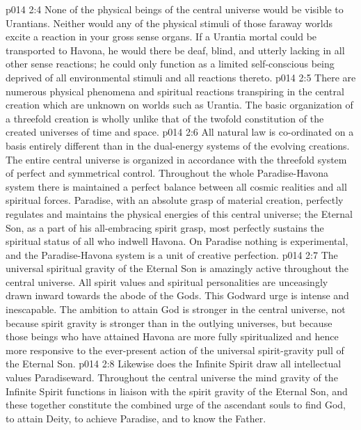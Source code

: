 \vs p014 2:4 None of the physical beings of the central universe would be visible to Urantians. Neither would any of the physical stimuli of those faraway worlds excite a reaction in your gross sense organs. If a Urantia mortal could be transported to Havona, he would there be deaf, blind, and utterly lacking in all other sense reactions; he could only function as a limited self\hyp{}conscious being deprived of all environmental stimuli and all reactions thereto.
\vs p014 2:5 \pc There are numerous physical phenomena and spiritual reactions transpiring in the central creation which are unknown on worlds such as Urantia. The basic organization of a threefold creation is wholly unlike that of the twofold constitution of the created universes of time and space.
\vs p014 2:6 All natural law is co\hyp{}ordinated on a basis entirely different than in the dual\hyp{}energy systems of the evolving creations. The entire central universe is organized in accordance with the threefold system of perfect and symmetrical control. Throughout the whole Paradise\hyp{}Havona system there is maintained a perfect balance between all cosmic realities and all spiritual forces. Paradise, with an absolute grasp of material creation, perfectly regulates and maintains the physical energies of this central universe; the Eternal Son, as a part of his all\hyp{}embracing spirit grasp, most perfectly sustains the spiritual status of all who indwell Havona. On Paradise nothing is experimental, and the Paradise\hyp{}Havona system is a unit of creative perfection.
\vs p014 2:7 The universal spiritual gravity of the Eternal Son is amazingly active throughout the central universe. All spirit values and spiritual personalities are unceasingly drawn inward towards the abode of the Gods. This Godward urge is intense and inescapable. The ambition to attain God is stronger in the central universe, not because spirit gravity is stronger than in the outlying universes, but because those beings who have attained Havona are more fully spiritualized and hence more responsive to the ever\hyp{}present action of the universal spirit\hyp{}gravity pull of the Eternal Son.
\vs p014 2:8 Likewise does the Infinite Spirit draw all intellectual values Paradiseward. Throughout the central universe the mind gravity of the Infinite Spirit functions in liaison with the spirit gravity of the Eternal Son, and these together constitute the combined urge of the ascendant souls to find God, to attain Deity, to achieve Paradise, and to know the Father.
